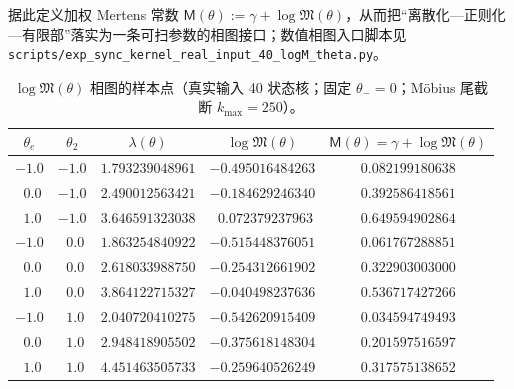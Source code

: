 

据此定义加权 Mertens 常数
\(
\mathsf{M}(\theta):=\gamma+\log\mathfrak{M}(\theta)
\)，从而把“离散化—正则化—有限部”落实为一条可扫参数的相图接口；数值相图入口脚本见
\texttt{scripts/exp\_sync\_kernel\_real\_input\_40\_logM\_theta.py}。

\begin{table}[H]
\centering
\scriptsize
\setlength{\tabcolsep}{8pt}
\renewcommand{\arraystretch}{1.15}
\caption{$\log\mathfrak{M}(\theta)$ 相图的样本点（真实输入 40 状态核；固定 $\theta_-=0$；Möbius 尾截断 $k_{\max}=250$）。}
\label{tab:real-input-40-logM-theta-sample}
\begin{tabular}{@{}ccccc@{}}
\toprule
$\theta_e$ & $\theta_2$ & $\lambda(\theta)$ & $\log\mathfrak{M}(\theta)$ & $\mathsf{M}(\theta)=\gamma+\log\mathfrak{M}(\theta)$ \\
\midrule
$-1.0$ & $-1.0$ & $1.793239048961$ & $-0.495016484263$ & $0.082199180638$ \\
$\ \ 0.0$ & $-1.0$ & $2.490012563421$ & $-0.184629246340$ & $0.392586418561$ \\
$\ \ 1.0$ & $-1.0$ & $3.646591323038$ & $\ \ 0.072379237963$ & $0.649594902864$ \\
$-1.0$ & $\ \ 0.0$ & $1.863254840922$ & $-0.515448376051$ & $0.061767288851$ \\
$\ \ 0.0$ & $\ \ 0.0$ & $2.618033988750$ & $-0.254312661902$ & $0.322903003000$ \\
$\ \ 1.0$ & $\ \ 0.0$ & $3.864122715327$ & $-0.040498237636$ & $0.536717427266$ \\
$-1.0$ & $\ \ 1.0$ & $2.040720410275$ & $-0.542620915409$ & $0.034594749493$ \\
$\ \ 0.0$ & $\ \ 1.0$ & $2.948418905502$ & $-0.375618148304$ & $0.201597516597$ \\
$\ \ 1.0$ & $\ \ 1.0$ & $4.451463505733$ & $-0.259640526249$ & $0.317575138652$ \\
\bottomrule
\end{tabular}
\end{table}

